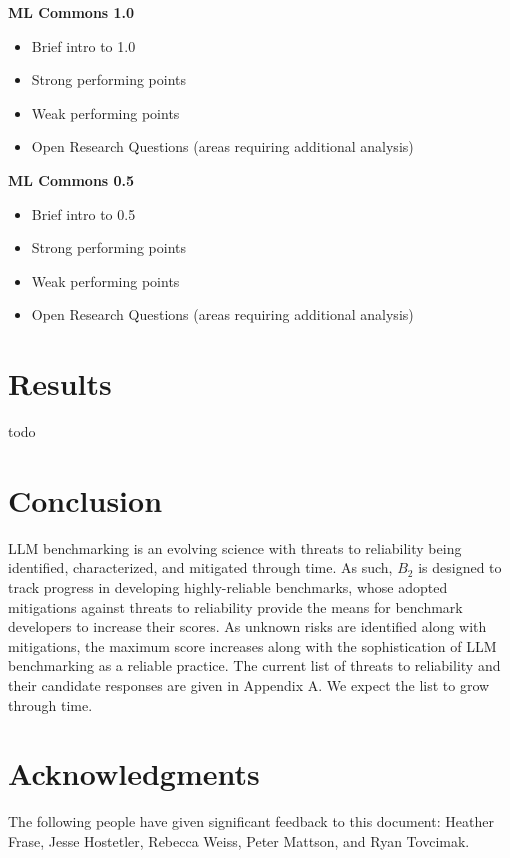 \documentclass{article}
\newcommand\bb{$B_2$ }
\begin{document}
{\bf ML Commons 1.0}
\begin{itemize}
\item Brief intro to 1.0
\item Strong performing points
\item Weak performing points
\item Open Research Questions (areas requiring additional analysis)
\end{itemize}

{\bf ML Commons 0.5}
\begin{itemize}
\item Brief intro to 0.5
\item Strong performing points
\item Weak performing points
\item Open Research Questions (areas requiring additional analysis)
\end{itemize}

\section{Results}
todo
\section{Conclusion}

LLM benchmarking is an evolving science with threats to reliability being identified, characterized, and mitigated through time. As such, \bb is designed to track progress in developing highly-reliable benchmarks, whose adopted mitigations against threats to reliability provide the means for benchmark developers to increase their scores. As unknown risks are identified along with mitigations, the maximum score increases along with the sophistication of LLM benchmarking as a reliable practice. The current list of threats to reliability and their candidate responses are given in Appendix A. We expect the list to grow through time.
\section{Acknowledgments}
The following people have given significant feedback to this document: Heather Frase, Jesse Hostetler, Rebecca Weiss, Peter Mattson, and Ryan Tovcimak.





\appendix 




\end{document}
